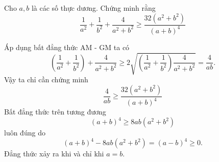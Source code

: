 \begin{problem}
	Cho $a, b$ là các số thực dương. Chứng minh rằng
	\[
		\frac{1}{a^2} + \frac{1}{b^2} + \frac{4}{a^2 + b^2} \ge \frac{32(a^2 + b^2)}{(a + b)^4}
	\]
	\solution

	Áp dụng bất đẳng thức AM - GM ta có
	\[
		\left(\frac{1}{a^2} + \frac{1}{b^2}\right) + \frac{4}{a^2 + b^2}
		\ge 2\sqrt{\left(\frac{1}{a^2} + \frac{1}{b^2}\right)\frac{4}{a^2 + b^2}}
		= \frac{4}{ab}.
	\]
	Vậy ta chỉ cần chứng minh 
	\[
		\frac{4}{ab} \ge \frac{32(a^2 + b^2)}{(a + b)^4}
	\]
	Bất đẳng thức trên tương đương
	\[
		(a + b)^4 \ge 8ab(a^2 + b^2)
	\]	
	luôn đúng do 
	\[
		(a + b)^4 - 8ab(a^2 + b^2) = (a - b)^4 \ge 0.
	\]
	Đẳng thức xảy ra khi và chỉ khi $a = b$.
\end{problem}